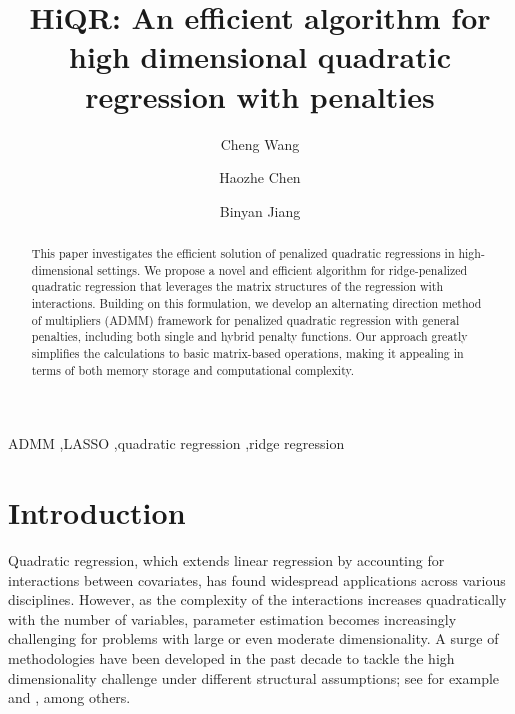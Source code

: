 \documentclass[preprint,authoryear,11pt]{elsarticle}
\begin{document}
	
	\begin{frontmatter}
		\title{HiQR: An efficient algorithm for high dimensional quadratic regression with penalties}
\author[a1]{Cheng Wang}

				
\author[a1]{Haozhe Chen}


\author[a2]{Binyan Jiang}


\address[a1]{School of Mathematical Sciences, MOE-LSC,\\ Shanghai Jiao Tong University,  Shanghai 200240, China.}

\address[a2]{Department of Applied Mathematics, \\The Hong Kong Polytechnic University,
	Hung Hom, Kowloon, Hong Kong.}

		
		
	
		
		\begin{abstract}  
This paper investigates the efficient solution of penalized quadratic regressions in high-dimensional settings. We propose a novel and efficient algorithm for ridge-penalized quadratic regression that leverages the matrix structures of the regression with interactions. Building on this formulation, we develop an alternating direction method of multipliers (ADMM) framework for penalized quadratic regression with general penalties, including both single and hybrid penalty functions. Our approach greatly simplifies the calculations to basic matrix-based operations, making it appealing in terms of both memory storage and computational complexity.
	\end{abstract}
		
		\begin{keyword} ADMM \sep LASSO %
  \sep quadratic regression \sep ridge regression
		\end{keyword}
		
	\end{frontmatter}
\section{Introduction}

 

Quadratic regression, which extends linear regression by accounting for interactions between covariates, has found widespread applications across various disciplines.  However, as the complexity of the interactions increases quadratically with the number of variables, parameter estimation becomes increasingly challenging for problems with large or even moderate dimensionality.  A surge of methodologies have been developed in the past decade to tackle the high dimensionality challenge under different structural assumptions; see for example \cite{bien2013lasso, hao2014interaction, hao2016model,hao2017note, yu2019reluctant, tang2020high, lu2021} and  \cite{wang2021penalized}, among others. %
  
\end{document}

